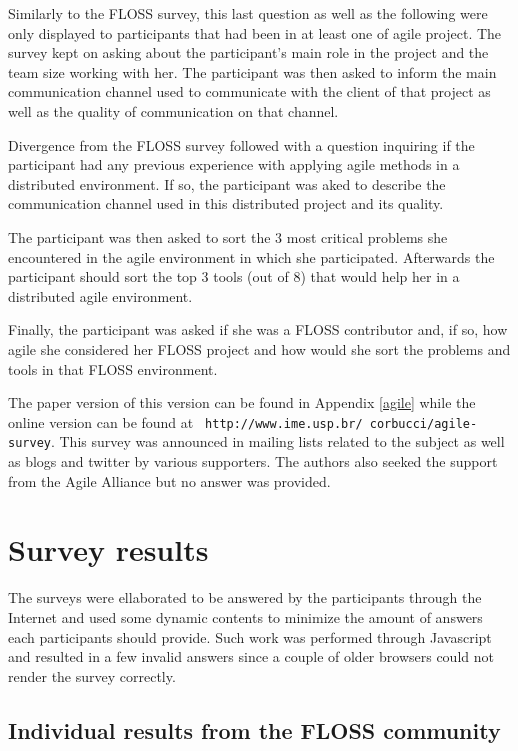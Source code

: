 \documentclass[lnbip]{svmultln}
\begin{document}
Similarly to the FLOSS survey, this last question as well as the
following were only displayed to participants that had been in at
least one of agile project. The survey kept on asking about the
participant's main role in the project and the team size working with
her. The participant was then asked to inform the main communication
channel used to communicate with the client of that project as well as
the quality of communication on that channel.

Divergence from the FLOSS survey followed with a question inquiring if
the participant had any previous experience with applying agile
methods in a distributed environment. If so, the participant was aked
to describe the communication channel used in this distributed project
and its quality.

The participant was then asked to sort the 3 most critical problems
she encountered in the agile environment in which she
participated. Afterwards the participant should sort the top 3 tools
(out of 8) that would help her in a distributed agile environment.

Finally, the participant was asked if she was a FLOSS contributor and,
if so, how agile she considered her FLOSS project and how would she
sort the problems and tools in that FLOSS environment.

The paper version of this version can be found in Appendix \ref{agile}
while the online version can be found at {\tt
  http://www.ime.usp.br/~corbucci/agile-survey}. This survey was
announced in mailing lists related to the subject as well as blogs and
twitter by various supporters. The authors also seeked the support
from the Agile Alliance but no answer was provided.

\section{Survey results}
\label{sec:results}

The surveys were ellaborated to be answered by the participants
through the Internet and used some dynamic contents to minimize the
amount of answers each participants should provide. Such work was
performed through Javascript and resulted in a few invalid answers
since a couple of older browsers could not render the survey
correctly. 

\subsection{Individual results from the FLOSS community}
\label{subsec:floss-results}
\end{document}
